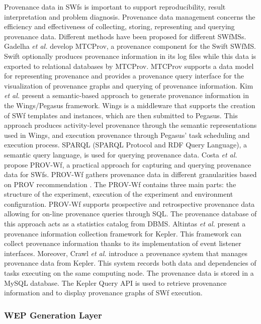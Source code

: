 Provenance data in SWfs is important 
to support reproducibility, result interpretation and problem diagnosis.
Provenance data management concerns the efficiency and effectiveness
of collecting, storing, representing and querying provenance data.
Different methods have been proposed for different SWfMSs.
Gadelha \textit{et al.} \cite{Gadelha2013} develop MTCProv,
a provenance component for the Swift SWfMS. Swift optionally produces provenance
information in its log files while this data is exported to relational
databases by MTCProv. MTCProv supports a data model for representing
provenance and provides a provenance query interface for the visualization
of provenance graphs and querying of provenance information. Kim \textit{et
al.} \cite{Kim2008} present a semantic-based approach to generate
provenance information in the Wings/Pegasus
framework. Wings is a middleware that supports the creation of SWf templates and instances, which are then submitted to Pegasus. This
approach produces activity-level provenance through the semantic
representations used in Wings, and execution provenance through
Pegasus' task scheduling and execution process.
SPARQL (SPARQL Protocol and RDF Query Language), a semantic query language,
is used for querying provenance data. Costa \textit{et al.}
\cite{Costa2013} propose PROV-Wf, a practical approach for capturing
and querying provenance data for SWfs. PROV-Wf gathers provenance data in different
granularities based on PROV
recommendation \cite{Belhajjame2011}. The PROV-Wf contains three
main parts: the structure of the experiment, execution of the experiment
and environment configuration. PROV-Wf supports prospective 
and retrospective provenance data allowing for on-line provenance queries 
through SQL. The provenance database of this approach acts as a statistics catalog from DBMS. Altintas
\textit{et al.} \cite{Altintas2006} present a provenance information
collection framework for Kepler. This framework can
collect provenance information thanks to its implementation of
event listener interfaces. Moreover, Crawl \textit{et al.} \cite{Crawl2011}
introduce a provenance system that manages provenance data from Kepler.
This system records both data and dependencies of tasks executing
on the same computing node. The provenance data is stored in a MySQL database.
The Kepler Query API is used to retrieve provenance information and
to display provenance graphs of SWf execution.

\subsubsection{WEP Generation Layer}
\label{sec:subsubsec:WGL}

